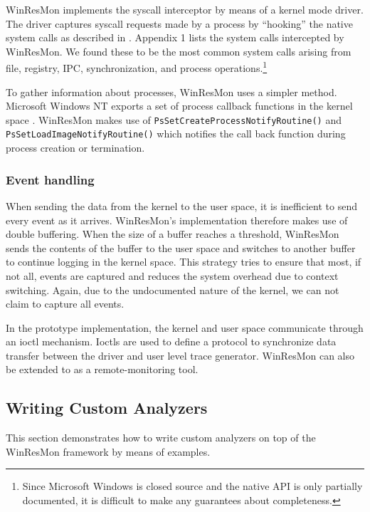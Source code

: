 WinResMon implements the syscall interceptor by means of a kernel mode driver.
The driver captures syscall requests made by a process by ``hooking'' the
native system calls as described in \cite{ddj-nthooking}.  Appendix 1 lists the
system calls intercepted by WinResMon.  We found these to be the most common
system calls arising from file, registry, IPC, synchronization, and process
operations.\footnote{ Since Microsoft Windows is closed source and the native
API is only partially documented, it is difficult to make any guarantees about
completeness.  }

To gather information about processes, WinResMon uses a simpler method.
Microsoft Windows NT exports a set of process callback functions in the kernel
space \cite{msdn-proccallback}.
WinResMon makes use of {\small\tt PsSetCreateProcessNotifyRoutine()} and
{\small\tt PsSetLoadImageNotifyRoutine()} which notifies the call back function
during process creation or termination.


\subsubsection{Event handling}

When sending the data from the kernel to the user space, it is inefficient to
send every event as it arrives.  WinResMon's implementation therefore makes use
of double buffering.  When the size of a buffer reaches a threshold, WinResMon
sends the contents of the buffer to the user space and switches to another
buffer to continue logging in the kernel space.  This strategy tries to ensure
that most, if not all, events are captured and reduces the system overhead due
to context switching.  Again, due to the undocumented nature of the kernel, we
can not claim to capture all events.

In the prototype implementation, the kernel and user space communicate through
an ioctl mechanism. Ioctls are used to define a protocol 
to synchronize data transfer between the driver and 
user level trace generator.
WinResMon can also be extended to as a remote-monitoring tool.


\subsection{Writing Custom Analyzers}
\label{sect:sample}

This section demonstrates how to write custom analyzers on top of the WinResMon
framework by means of examples.

